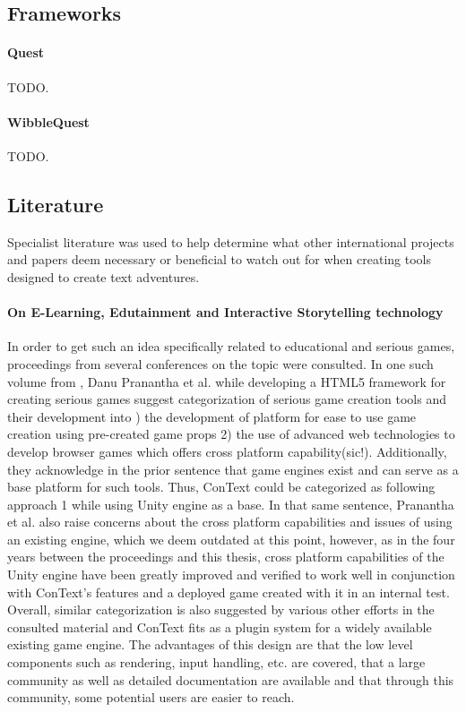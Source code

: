 \subsection{Frameworks}
\paragraph{Quest} %
TODO.
\paragraph{WibbleQuest} %
TODO.

\subsection{Literature}
Specialist literature was used to help determine what other international projects and papers deem necessary or beneficial to watch out for when creating tools designed to create text adventures. 
\paragraph{On E-Learning, Edutainment and Interactive Storytelling technology}
In order to get such an idea specifically related to educational and serious games, proceedings from several conferences on the topic were consulted. In one such volume from \cite{ELEARN}, Danu Pranantha et al. while developing a HTML5 framework for creating serious games suggest categorization of serious game creation tools and their development into ) the development of platform for ease to use game creation using pre-created game props 2) the use of advanced web technologies to develop browser games which offers cross platform capability\grqq (sic!)\cite{ELEARN1}. Additionally, they acknowledge in the prior sentence that game engines exist and can serve as a base platform for such tools. Thus, ConText could be categorized as following approach 1 while using Unity engine as a base. In that same sentence, Pranantha et al. also raise concerns about the cross platform capabilities and issues of using an existing engine, which we deem outdated at this point, however, as in the four years between the proceedings and this thesis, cross platform capabilities of the Unity engine have been greatly improved and verified to work well in conjunction with ConText's features and a deployed game created with it in an internal test. Overall, similar categorization is also suggested by various other efforts in the consulted material and ConText fits as a plugin system for a widely available existing game engine. The advantages of this design are that the low level components such as rendering, input handling, etc. are covered, that a large community as well as detailed documentation are available and that through this community, some potential users are easier to reach. 

